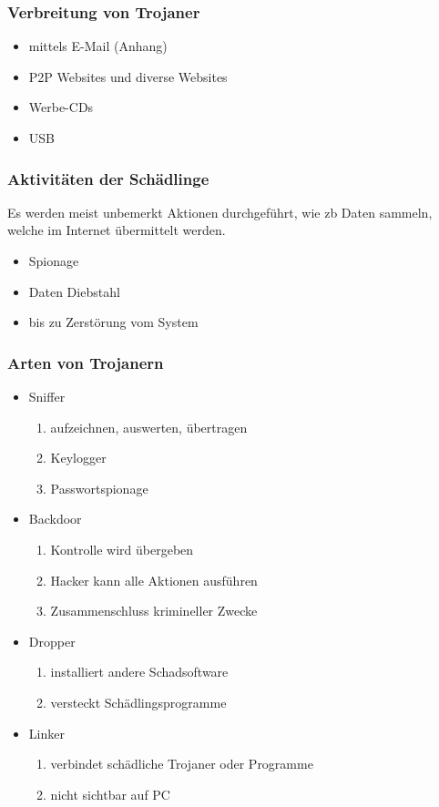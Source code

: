 \documentclass{beamer}
\begin{document}
\begin{frame}
	\frametitle{Verbreitung von Trojaner}
	\begin{itemize}
		\item mittels E-Mail (Anhang)
		\item P2P Websites und diverse Websites
		\item Werbe-CDs
		\item USB
	\end{itemize}
\end{frame}


\begin{frame}
	\frametitle{Aktivitäten der Schädlinge}
	Es werden meist unbemerkt Aktionen durchgeführt, wie zb Daten sammeln, welche im Internet übermittelt werden.
	\begin{itemize}
		\item Spionage
		\item Daten Diebstahl
		\item bis zu Zerstörung vom System
	\end{itemize}
\end{frame}

\begin{frame}
	\frametitle{Arten von Trojanern}
	\begin{itemize}
		\item Sniffer
		\begin{enumerate}
			\item aufzeichnen, auswerten, übertragen
			\item Keylogger
			\item Passwortspionage 
		\end{enumerate}
		\item Backdoor
		\begin{enumerate}
			\item Kontrolle wird übergeben
			\item Hacker kann alle Aktionen ausführen
			\item Zusammenschluss krimineller Zwecke
		\end{enumerate}
		\item Dropper
		\begin{enumerate}
			\item installiert andere Schadsoftware
			\item versteckt Schädlingsprogramme 
		\end{enumerate}
		\item Linker
		\begin{enumerate}
			\item verbindet schädliche Trojaner oder Programme
			\item nicht sichtbar auf PC
		\end{enumerate}
	\end{itemize}
\end{frame}
\end{document}

